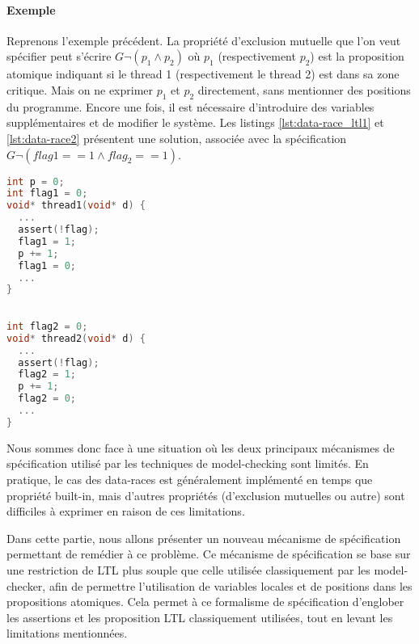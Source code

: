 \paragraph{Exemple}
Reprenons l'exemple précédent. La propriété d'exclusion
mutuelle que l'on veut spécifier peut s'écrire \(G \lnot (p_1 \land p_2)\) où
\(p_1\) (respectivement \(p_2\)) est la proposition atomique indiquant si le
thread 1 (respectivement le thread 2) est dans sa zone critique. Mais on ne
exprimer \(p_1\) et \(p_2\) directement, sans mentionner des positions du
programme. Encore une fois, il est nécessaire d'introduire des variables
supplémentaires et de modifier le système. Les listings \ref{lst:data-race_ltl1}
et \ref{lst:data-race2} présentent une solution, associée avec la spécification
\(G \lnot (flag1 == 1 \land flag_2 == 1)\).

\noindent\begin{minipage}{.45\textwidth}
  \begin{lstlisting}[language=C, frame=single, caption=Thread 1,
    label=lst:data-race_ltl1]
int p = 0;
int flag1 = 0;
void* thread1(void* d) {
  ...
  assert(!flag);
  flag1 = 1;
  p += 1;
  flag1 = 0;
  ...
}
\end{lstlisting}
\end{minipage}\hfill
\begin{minipage}{.45\textwidth}
\begin{lstlisting}[language=C, frame=single, caption=Thread 2,
    label=lst:data-race_ltl2]

int flag2 = 0;
void* thread2(void* d) {
  ...
  assert(!flag);
  flag2 = 1;
  p += 1;
  flag2 = 0;
  ...
}
\end{lstlisting}
\end{minipage}


Nous sommes donc face à une situation où les deux principaux mécanismes de
spécification utilisé par les techniques de model-checking sont limités. En
pratique, le cas des data-races est généralement implémenté en temps que
propriété built-in, mais d'autres propriétés (d'exclusion mutuelles ou autre)
sont difficiles à exprimer en raison de ces limitations.

Dans cette partie, nous allons présenter un nouveau mécanisme de spécification
permettant de remédier à ce problème. Ce mécanisme de spécification se base sur
une restriction de \ac{LTL} plus souple que celle utilisée classiquement par les
model-checker, afin de permettre l'utilisation de variables locales et de
positions dans les propositions atomiques. Cela permet à ce formalisme de
spécification d'englober les assertions et les proposition LTL classiquement
utilisées, tout en levant les limitations mentionnées.

